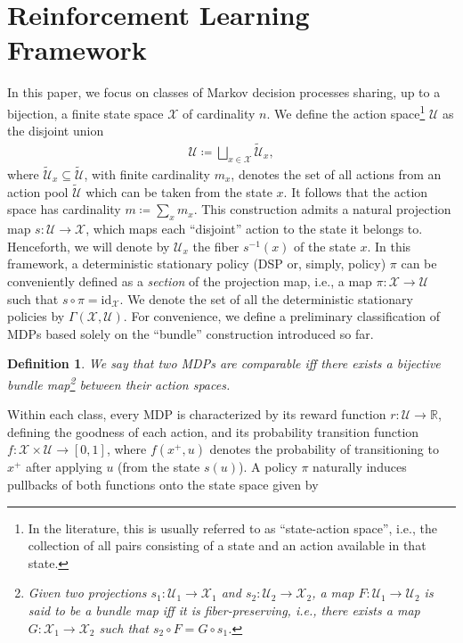 \documentclass[10pt,leqno]{amsart}
\newcommand{\sml}{\scriptscriptstyle}
\newcommand{\id}[1]{\text{id}_{\sml #1}}
\newcommand{\R}{\mathbb{R}}
\newcommand{\U}{\mathcal{U}}
\newcommand{\X}{\mathcal{X}}
\newcommand{\cost}{r}
\newcommand{\f}{f}
\newcommand{\policy}{\pi}
\newcommand{\Sect}{\Gamma(\X, \U)}
\newcommand{\state}{x} %
\newcommand{\act}{u}   %
\newcommand{\proj}{s}
\newtheorem{definition}[theorem]{Definition}
\begin{document}
\section{Reinforcement Learning Framework}
\label{sec:framework}
In this paper, we focus on classes of Markov decision processes sharing, up to a bijection, a finite state space $\X$ of cardinality $n$. We define the action space\footnote{In the literature, this is usually referred to as ``state-action space'', i.e., the collection of all pairs consisting of a state and an action available in that state.} $\U$ as the disjoint union
\begin{align*}
    \U \coloneqq \bigsqcup_{\state \in \X} \widetilde{\U}_{\state},
\end{align*}
where $\widetilde{\U}_{\state} \subseteq \widetilde{\U}$, with finite cardinality $m_{\state}$, denotes the set of all actions from an action pool $\widetilde{\U}$ which can be taken from the state $\state$. It follows that the action space has cardinality $m \coloneqq \sum_\state m_\state$. This construction admits a natural projection map $\proj : \U \to \X$, which maps each ``disjoint'' action to the state it belongs to. Henceforth, we will denote by $\U_\state$ the fiber $\proj^{-1}(\state)$ of the state $\state$. In this framework, a deterministic stationary policy (DSP or, simply, policy) $\policy$ can be conveniently defined as a \emph{section} of the projection map, i.e., a map $\policy : \X \to \U$ such that $\proj \circ \policy = \id{\X}$. We denote the set of all the deterministic stationary policies by $\Sect$. For convenience, we define a preliminary classification of MDPs based solely on the ``bundle'' construction introduced so far. 
\begin{definition}
    We say that two MDPs are comparable iff there exists a bijective bundle map\footnote{Given two projections $\proj_1: \U_1 \to \X_1$ and $\proj_2: \U_2 \to \X_2$, a map $F : \U_1 \to \U_2$ is said to be a \textit{bundle map} iff it is fiber-preserving, i.e., there exists a map $G : \X_1 \to \X_2$ such that $\proj_2 \circ F = G \circ \proj_1$.} between their action spaces.
\end{definition}
\noindent
Within each class, every MDP is characterized by its reward function $\cost : \U \to \R$, defining the goodness of each action, and its probability transition function $\f : \X \times \U \to [0, 1]$, where $\f(\state^+\!, \act)$ denotes the probability of transitioning to $\state^+$ after applying $\act$ (from the state $\proj(\act)$). A policy $\policy$ naturally induces pullbacks of both functions onto the state space given by
\end{document}
